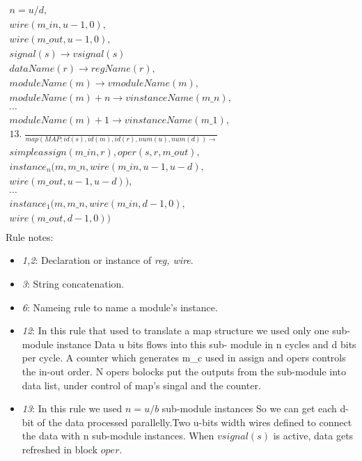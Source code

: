 \[ \begin{aligned}
  \mathit{n=u{/}d,}\\
  \mathit{wire(m\_in,u{-}1,0),}\\
  \mathit{wire(m\_out,u{-}1,0),}\\
  \mathit{signal(s) \rightarrow vsignal(s)} \\
  \mathit{dataName(r) \rightarrow regName(r),}\\
  \mathit{moduleName(m) \rightarrow vmoduleName(m),}\\
  \mathit{moduleName(m){+}n \rightarrow vinstanceName(m\_n),}\\
  \mathit{\cdots}\\
  \mathit{moduleName(m){+}1 \rightarrow vinstanceName(m\_1),}\\
  \mathit{13.\;\frac{}{map(MAP; id(s),id(m),id(r),num(u),num(d)) \rightarrow}}\\
  \mathit{simpleassign(m\_in,r),oper(s,r,m\_out),}\\
  \mathit{instance_n(m,m\_n,wire(m\_in,u{-}1,u{-}d),}\\
  \mathit{wire(m\_out,u{-}1,u{-}d)),}\\
  \mathit{\cdots}\\
  \mathit{instance_1(m,m\_n,wire(m\_in,d{-}1,0),}\\
  \mathit{wire(m\_out,d{-}1,0))}\\
\end{aligned}
\phantom{\hspace{100cm}}
\]
\normalfont
Rule notes:
\begin{itemize}\itemsep2pt \parskip0pt 
  \item[$\star$]\textit{1,2}: Declaration or instance of \textit{reg, wire}.
  \item[$\star$]\textit{3}: String concatenation.
  \item[$\star$]\textit{6}: Nameing rule to name a module's instance.
  \item[$\star$]\textit{12}: In this rule that used to translate a map structure we used only
                 one sub-module instance Data u bits flows into this sub-
                 module in  n cycles and d bits per cycle. A counter which generates m\_c 
                 used in assign and opers controls the in-out order. N opers 
                 bolocks put the outputs from the sub-module into data list, under control 
                 of map's singal and the counter.
  \item[$\star$]\textit{13}: In this rule we used $n=u/b$
                 sub-module instances So we can get each d-bit of the data processed 
                 parallelly.Two u-bits width wires defined to connect the data with n 
                 sub-module instances. When $vsignal(s)$ is active, data gets refreshed 
                 in block $oper$.
\end{itemize}
